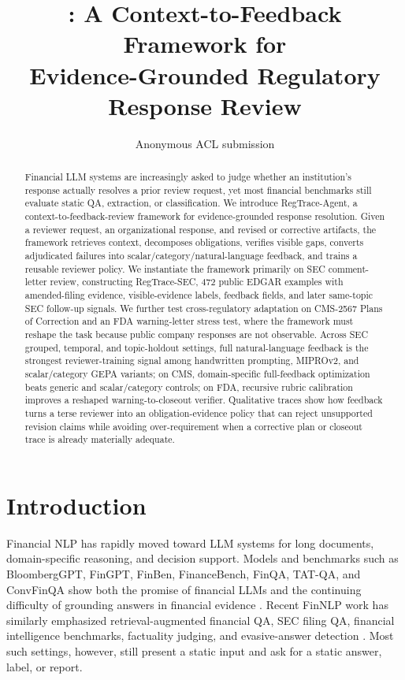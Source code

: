 \documentclass[11pt]{article}
\title{\framework{}: A Context-to-Feedback Framework for\\
Evidence-Grounded Regulatory Response Review}
\author{Anonymous ACL submission}
\newcommand{\task}{evidence-grounded response resolution}
\newcommand{\dataset}{RegTrace-SEC}
\newcommand{\framework}{RegTrace-Agent}
\begin{document}
\maketitle
\begin{abstract}
Financial LLM systems are increasingly asked to judge whether an institution's response actually resolves a prior review request, yet most financial benchmarks still evaluate static QA, extraction, or classification. We introduce \framework{}, a context-to-feedback-review framework for \task{}. Given a reviewer request, an organizational response, and revised or corrective artifacts, the framework retrieves context, decomposes obligations, verifies visible gaps, converts adjudicated failures into scalar/category/natural-language feedback, and trains a reusable reviewer policy. We instantiate the framework primarily on SEC comment-letter review, constructing \dataset{}, 472 public EDGAR examples with amended-filing evidence, visible-evidence labels, feedback fields, and later same-topic SEC follow-up signals. We further test cross-regulatory adaptation on CMS-2567 Plans of Correction and an FDA warning-letter stress test, where the framework must reshape the task because public company responses are not observable. Across SEC grouped, temporal, and topic-holdout settings, full natural-language feedback is the strongest reviewer-training signal among handwritten prompting, MIPROv2, and scalar/category GEPA variants; on CMS, domain-specific full-feedback optimization beats generic and scalar/category controls; on FDA, recursive rubric calibration improves a reshaped warning-to-closeout verifier. Qualitative traces show how feedback turns a terse reviewer into an obligation-evidence policy that can reject unsupported revision claims while avoiding over-requirement when a corrective plan or closeout trace is already materially adequate.
\end{abstract}

\section{Introduction}

Financial NLP has rapidly moved toward LLM systems for long documents, domain-specific reasoning, and decision support. Models and benchmarks such as BloombergGPT, FinGPT, FinBen, FinanceBench, FinQA, TAT-QA, and ConvFinQA show both the promise of financial LLMs and the continuing difficulty of grounding answers in financial evidence \citep{wu2023bloomberggpt,yang2023fingpt,xie2024finben,islam2023financebench,chen2021finqa,zhu2021tatqa,chen2022convfinqa}. Recent FinNLP work has similarly emphasized retrieval-augmented financial QA, SEC filing QA, financial intelligence benchmarks, factuality judging, and evasive-answer detection \citep{lithgow2025rag,lai2025secqa,klimaszewski2025avenibench,wu2025nli,nuaimi2025evasive}. Most such settings, however, still present a static input and ask for a static answer, label, or report.
\end{document}
